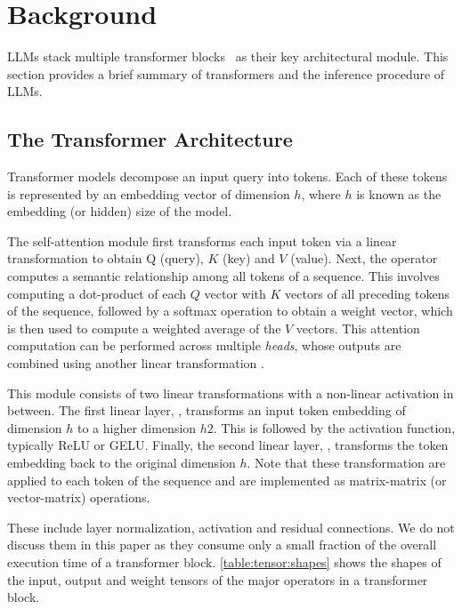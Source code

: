 \section{Background}
\label{sec:background}

LLMs stack multiple transformer blocks~\cite{attentionpaper} as their key architectural module. This section provides a brief summary of transformers and the inference procedure of LLMs.

\subsection{The Transformer Architecture}
\label{sec:background:arch}

Transformer models decompose an input query into tokens. Each of these tokens is represented by an embedding vector of dimension $h$, where $h$ is known as the embedding (or hidden) size of the model.

 The self-attention module first transforms each input token via a linear transformation \attnpreproj to obtain Q (query), $K$ (key) and $V$ (value).
Next, the \attn operator computes a semantic relationship among all tokens of a sequence. This involves computing a dot-product of each $Q$ vector with $K$ vectors of all preceding tokens of the sequence, followed by a softmax operation to obtain a weight vector, which is then used to compute a weighted average of the $V$ vectors. This attention computation can be performed across multiple \textit{heads}, whose outputs are combined using another linear transformation \attnpostproj. 

This module consists of two linear transformations with a non-linear activation in between. The first linear layer, \ffnlnfirst, transforms an input token embedding of dimension $h$ to a higher dimension $h2$. This is followed by the activation function, typically ReLU or GELU. Finally, the second linear layer, \ffnlnsecond, transforms the token embedding back to the original dimension $h$. Note that these transformation are applied to each token of the sequence and are implemented as matrix-matrix (or vector-matrix) operations.

 These include layer normalization, activation and residual connections. We do not discuss them in this paper as they consume only a small fraction of the overall execution time of a transformer block. \autoref{table:tensor:shapes} shows the shapes of the input, output and weight tensors of the major operators in a transformer block. 

